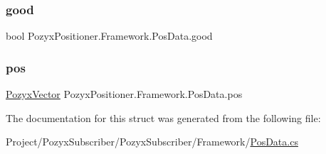 \subsubsection{\texorpdfstring{good}{good}}
{\footnotesize\ttfamily bool Pozyx\+Positioner.\+Framework.\+Pos\+Data.\+good}

\mbox{\label{struct_pozyx_positioner_1_1_framework_1_1_pos_data_a2fde856e364bb1dfcc74e654d7eef2f9}} 
\subsubsection{\texorpdfstring{pos}{pos}}
{\footnotesize\ttfamily \hyperlink{struct_pozyx_positioner_1_1_framework_1_1_pozyx_vector}{Pozyx\+Vector} Pozyx\+Positioner.\+Framework.\+Pos\+Data.\+pos}



The documentation for this struct was generated from the following file\+:\begin{DoxyCompactItemize}
\item 
Project/\+Pozyx\+Subscriber/\+Pozyx\+Subscriber/\+Framework/\hyperlink{_pos_data_8cs}{Pos\+Data.\+cs}\end{DoxyCompactItemize}
